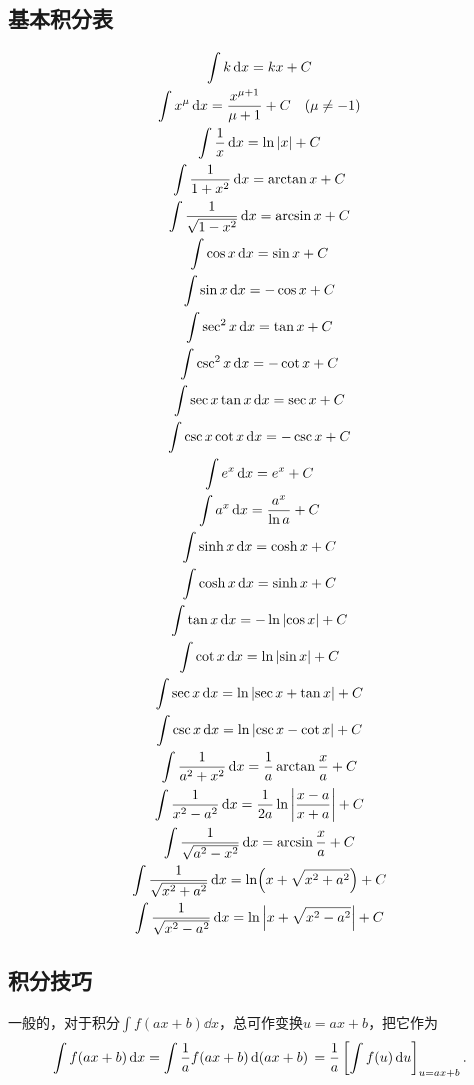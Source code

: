 \subsection{基本积分表}
\begingroup
\def\intx#1{\int #1\dd{x}}%
\begin{gather}
\intx{k} = kx + C \\
\intx{x^\mu} = \frac{x^{\mu + 1}}{\mu + 1} + C \quad (\mu \neq -1) \\
\intx{\frac{1}{x}} = \ln\abs{x} + C \\
\intx{\frac{1}{1 + x^2}} = \arctan x + C \\
\intx{\frac{1}{\sqrt{1 - x^2}}} = \arcsin x + C \\
\intx{\cos x} = \sin x + C \\
\intx{\sin x} = -\cos x + C \\
\intx{\sec^2 x} = \tan x + C \\
\intx{\csc^2 x} = -\cot x + C \\
\intx{\sec x \tan x} = \sec x + C \\
\intx{\csc x \cot x} = -\csc x + C \\
\intx{e^x} = e^x + C \\
\intx{a^x} = \frac{a^x}{\ln a} + C \\
\intx{\sinh x} = \cosh x + C \\
\intx{\cosh x} = \sinh x + C \\
\intx{\tan x} = -\ln\abs{\cos x} + C \\
\intx{\cot x} = \ln\abs{\sin x} + C \\
\intx{\sec x} = \ln\abs{\sec x + \tan x} + C \\
\intx{\csc x} = \ln\abs{\csc x - \cot x} + C \\
\intx{\frac{1}{a^2 + x^2}} = \frac{1}{a} \arctan\frac{x}{a} + C \\
\intx{\frac{1}{x^2 - a^2}} = \frac{1}{2a} \ln\abs{\frac{x - a}{x + a}} + C \\
\intx{\frac{1}{\sqrt{a^2 - x^2}}} = \arcsin\frac{x}{a} + C \\
\intx{\frac{1}{\sqrt{x^2 + a^2}}} = \ln(x + \sqrt{x^2 + a^2}) + C \\
\intx{\frac{1}{\sqrt{x^2 - a^2}}} = \ln\abs{x + \sqrt{x^2 - a^2}} + C
\end{gather}
\endgroup

\subsection{积分技巧}
\begin{example}
一般的，对于积分\(\int f(ax+b) \dd{x}\)，总可作变换\(u=ax+b\)，把它作为\[
\int f(ax+b) \dd{x}
= \int \frac{1}{a} f(ax+b) \dd{(ax+b)} \\
= \frac{1}{a} \left[ \int f(u) \dd{u} \right]_{u=ax+b}.
\]
\end{example}

